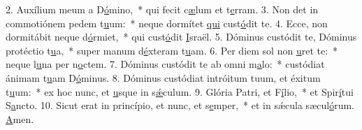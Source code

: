 2. Auxílium meum a D\uline{ó}mino,~* qui fecit c\uline{æ}lum et t\uline{e}rram.
3. Non det in commotiónem pedem t\uline{u}um:~* neque dormítet \uline{qui} cust\uline{ó}dit te.
4. Ecce, non dormitábit neque d\uline{ó}rmiet,~* qui cust\uline{ó}dit \uline{I}sraël.
5. Dóminus custódit te, Dóminus protéctio t\uline{u}a,~* super manum d\uline{é}xteram t\uline{u}am.
6. Per diem sol non \uline{u}ret te:~* neque l\uline{u}na per n\uline{o}ctem.
7. Dóminus custódit te ab omni m\uline{a}lo:~* custódiat ánimam t\uline{u}am D\uline{ó}minus.
8. Dóminus custódiat intróitum tuum, et éxitum t\uline{u}um:~* ex hoc nunc, et \uline{u}sque in s\uline{ǽ}culum.
9. Glória Patri, et F\uline{í}lio,~* et Spir\uline{í}tui S\uline{a}ncto.
10. Sicut erat in princípio, et nunc, et s\uline{e}mper,~* et in sǽcula sæcul\uline{ó}rum. \uline{A}men.
